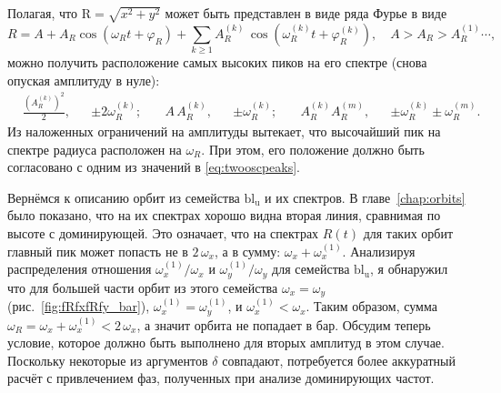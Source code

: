 \documentclass[tikz]{trlnotes}
\begin{document}
Полагая, что $\mathrm{R} = \sqrt{x^2 + y^2}$ может быть представлен в виде ряда Фурье в виде
\begin{equation}
  R = A + A_R \cos (\omega_R t + φ_R) + \sum_{k \geqslant 1} A_R^{(k)}\, \cos (\omega_R^{(k)} t + φ_R^{(k)}),
  \quad A > A_R >A_R^{(1)} \dotsb,
\end{equation}
можно получить расположение самых высоких пиков на его спектре (снова опуская амплитуду в нуле):
\begin{equation}
  \begin{aligned}
    &\frac{\left(A_R^{(k)}\right)^2}{2},& & \pm 2\omega_R^{(k)}; \quad
    &A\,A_R^{(k)}, && \pm \omega_R^{(k)}                       ; \quad
    &A_R^{(k)} A_R^{(m)},&& \pm \omega_R^{(k)} \pm \omega_R^{(m)}.
  \end{aligned}
\end{equation}
Из наложенных ограничений на амплитуды вытекает, что высочайший пик на спектре радиуса расположен на $\omega_R$.
При этом, его положение должно быть согласовано с одним из значений в \eqref{eq:twooscpeaks}.

Вернёмся к описанию орбит из семейства $\text{bl}_\text{u}$ и их спектров. В главе~\ref{chap:orbits} было показано, что на их спектрах хорошо видна вторая линия, сравнимая по высоте с доминирующей. Это означает, что на спектрах $R(t)$
для таких орбит главный пик может попасть не в $2\,ω_x$, а в сумму: $ω_x + ω_{x}^{(1)}$. Анализируя распределения
отношения $ω_x^{(1)}/ω_x$ и $ω_y^{(1)}/ω_y$ для семейства $\text{bl}_\text{u}$, я обнаружил что для большей части орбит из этого семейства $ω_x =
ω_y$ (рис.~\ref{fig:fRfxfRfy_bar}), $ω_x^{(1)} = ω_y^{(1)}$, и
$ω_x^{(1)} < ω_x$. Таким образом, сумма $ω_R = ω_x + ω_x^{(1)} < 2\, ω_x$, а значит орбита не попадает в бар. 
Обсудим теперь условие, которое должно быть выполнено для вторых амплитуд в этом случае.
Поскольку некоторые из аргументов $δ$ совпадают, потребуется более аккуратный расчёт с привлечением
фаз, полученных при анализе доминирующих частот. 
\end{document}
